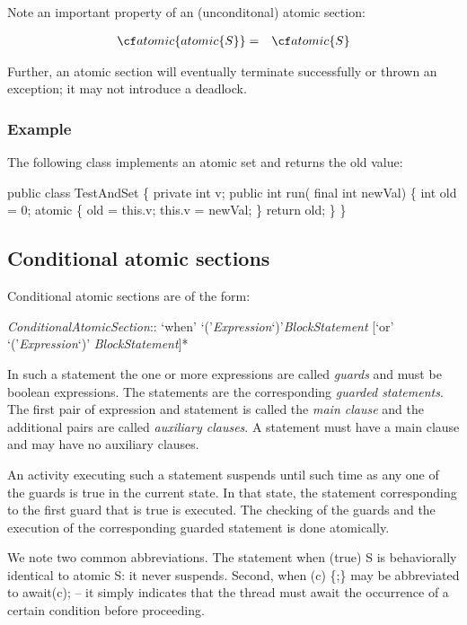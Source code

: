 {{Note an important property of an (unconditonal) atomic section:

\begin{eqnarray}
 {\cf atomic \{ atomic \{ S\}\}} &=& {\cf atomic \{S\}}
\end{eqnarray}

Further, an atomic section will eventually terminate successfully or
thrown an exception; it may not introduce a deadlock.

\subsubsection{Example}

The following class implements an atomic set and returns the old value:
\begin{x10}
public class TestAndSet \{
  private int v;
  public int run( final int newVal) \{
      int old = 0;
      atomic \{
          old = this.v;
          this.v = newVal;
      \}
      return old;
  \}
\}
\end{x10}
\subsection{Conditional atomic sections}

Conditional atomic sections are of the form:
\begin{x10}
  {\cf\em{}ConditionalAtomicSection}::
    `when' `('{\cf\em{}Expression}`)'{\cf\em{}BlockStatement}
    [`or' `('{\cf\em{}Expression}`)' {\cf\em{}BlockStatement}]*
\end{x10}

In such a statement the one or more expressions are called {\em
guards} and must be {\cf boolean} expressions. The statements are the
corresponding {\em guarded statements}. The first pair of expression
and statement is called the {\em main clause} and the additional pairs
are called {\em auxiliary clauses}. A statement must have a main
clause and may have no auxiliary clauses.

An activity executing such a statement suspends until such time as any
one of the guards is true in the current state. In that state, the
statement corresponding to the first guard that is true is executed.
The checking of the guards and the execution of the corresponding
guarded statement is done atomically. 

We note two common abbreviations. The statement {\cf when (true) S} is
behaviorally identical to {\cf atomic S}: it never suspends. Second,
{\cf when (c) \{;\}} may be abbreviated to {\cf await(c);} -- it
simply indicates that the thread must await the occurrence of a
certain condition before proceeding.  

}}
